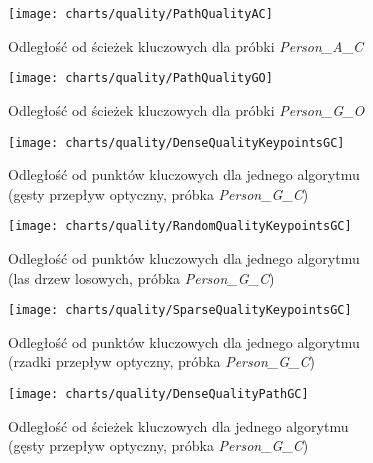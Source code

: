     \newpage
    \begin{figure}[!ht]
      \centering
      \texttt{[image: charts/quality/PathQualityAC]}
      \caption[Odległość od ścieżek kluczowych]
              {Odległość od ścieżek kluczowych dla próbki \textit{Person\_A\_C}}
      \label{fig:PathQualityAC}
    \end{figure}

    \begin{figure}[!ht]
      \centering
      \texttt{[image: charts/quality/PathQualityGO]}
      \caption[Odległość od ścieżek kluczowych]
              {Odległość od ścieżek kluczowych dla próbki \textit{Person\_G\_O}}
      \label{fig:PathQualityGO}
    \end{figure}

    \newpage
    \begin{figure}[!ht]
      \centering
      \texttt{[image: charts/quality/DenseQualityKeypointsGC]}
      \caption[Odległość od punktów kluczowych dla jednego algorytmu]
              {Odległość od punktów kluczowych dla jednego algorytmu\\(gęsty przepływ optyczny, próbka \textit{Person\_G\_C})}
      \label{fig:DenseQualityKeypointsGC}
    \end{figure}

    \begin{figure}[!ht]
      \centering
      \texttt{[image: charts/quality/RandomQualityKeypointsGC]}
      \caption[Odległość od punktów kluczowych dla jednego algorytmu]
              {Odległość od punktów kluczowych dla jednego algorytmu\\(las drzew losowych, próbka \textit{Person\_G\_C})}
      \label{fig:RandomQualityKeypointsGC}
    \end{figure}

    \begin{figure}[!ht]
      \centering
      \texttt{[image: charts/quality/SparseQualityKeypointsGC]}
      \caption[Odległość od punktów kluczowych dla jednego algorytmu]
              {Odległość od punktów kluczowych dla jednego algorytmu\\(rzadki przepływ optyczny, próbka \textit{Person\_G\_C})}
      \label{fig:SparseQualityKeypointsGC}
    \end{figure}

    \newpage
    \begin{figure}[!ht]
      \centering
      \texttt{[image: charts/quality/DenseQualityPathGC]}
      \caption[Odległość od ścieżek kluczowych dla jednego algorytmu]
              {Odległość od ścieżek kluczowych dla jednego algorytmu\\(gęsty przepływ optyczny, próbka \textit{Person\_G\_C})}
      \label{fig:DenseQualityPathGC}
    \end{figure}

